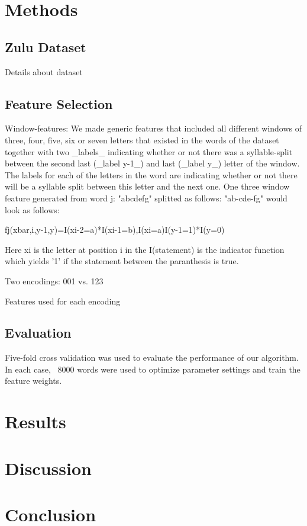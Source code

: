 \documentclass[10pt,twocolumn,letterpaper]{article}
\begin{document}
\section{Methods}
\subsection{Zulu Dataset}
Details about dataset

\subsection{Feature Selection}
Window-features:
We made generic features that included all different windows of three, four, five, six or seven letters that existed in the words of the dataset together with two _labels_ indicating whether or not there was a syllable-split between the second last (_label y-1_) and last (_label y_) letter of the window. The labels for each of the letters in the word are indicating whether or not there will be a syllable split between this letter and the next one. One three window feature generated from word j: "abcdefg" splitted as follows: "ab-cde-fg" would look as follows:

fj(xbar,i,y-1,y)=I(xi-2=a)*I(xi-1=b),I(xi=a)I(y-1=1)*I(y=0)

Here xi is the letter at position i in the I(statement) is the indicator function which yields '1' if the statement between the paranthesis is true.


Two encodings: 001 vs. 123

Features used for each encoding

\subsection{Evaluation}
Five-fold cross validation was used to evaluate the performance of our algorithm.  In each case, ~8000 words were used to optimize parameter settings and train the feature weights. 



\section{Results}
\section{Discussion}
\section{Conclusion}



{\small


}
\end{document}
